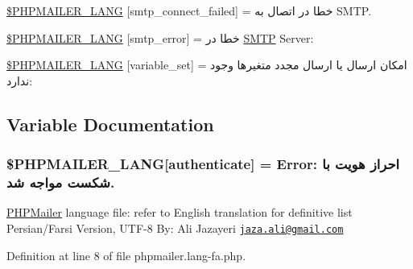 \begin{DoxyCompactItemize}
\item 
\hyperlink{phpmailer_8lang-fa_8php_a7b321d4ca1e9df702403ed4c61aa0980}{\$\+P\+H\+P\+M\+A\+I\+L\+E\+R\+\_\+\+L\+A\+NG} \mbox{[}\textquotesingle{}smtp\+\_\+connect\+\_\+failed\textquotesingle{}\mbox{]} = \textquotesingle{}خطا در اتصال به S\+M\+T\+P.\textquotesingle{}
\item 
\hyperlink{phpmailer_8lang-fa_8php_a7d9cffba1e669c845f8a4c891ee50064}{\$\+P\+H\+P\+M\+A\+I\+L\+E\+R\+\_\+\+L\+A\+NG} \mbox{[}\textquotesingle{}smtp\+\_\+error\textquotesingle{}\mbox{]} = \textquotesingle{}خطا در \hyperlink{class_s_m_t_p}{S\+M\+TP} Server\+: \textquotesingle{}
\item 
\hyperlink{phpmailer_8lang-fa_8php_af795debc7a739d038742691c358d9032}{\$\+P\+H\+P\+M\+A\+I\+L\+E\+R\+\_\+\+L\+A\+NG} \mbox{[}\textquotesingle{}variable\+\_\+set\textquotesingle{}\mbox{]} = \textquotesingle{}امکان ارسال یا ارسال مجدد متغیرها وجود ندارد\+: \textquotesingle{}
\end{DoxyCompactItemize}


\subsection{Variable Documentation}
\subsubsection[{\texorpdfstring{\$\+P\+H\+P\+M\+A\+I\+L\+E\+R\+\_\+\+L\+A\+NG}{$PHPMAILER_LANG}}]{\setlength{\rightskip}{0pt plus 5cm}\$P\+H\+P\+M\+A\+I\+L\+E\+R\+\_\+\+L\+A\+NG\mbox{[}\textquotesingle{}authenticate\textquotesingle{}\mbox{]} =  Error\+: احراز هویت با شکست مواجه شد.\textquotesingle{}}\hypertarget{phpmailer_8lang-fa_8php_a2cb33073c989b85580748e331ed8b4aa}{}\label{phpmailer_8lang-fa_8php_a2cb33073c989b85580748e331ed8b4aa}
\hyperlink{class_p_h_p_mailer}{P\+H\+P\+Mailer} language file\+: refer to English translation for definitive list Persian/\+Farsi Version, U\+T\+F-\/8 By\+: Ali Jazayeri \href{mailto:jaza.ali@gmail.com}{\tt jaza.\+ali@gmail.\+com} 

Definition at line 8 of file phpmailer.\+lang-\/fa.\+php.


